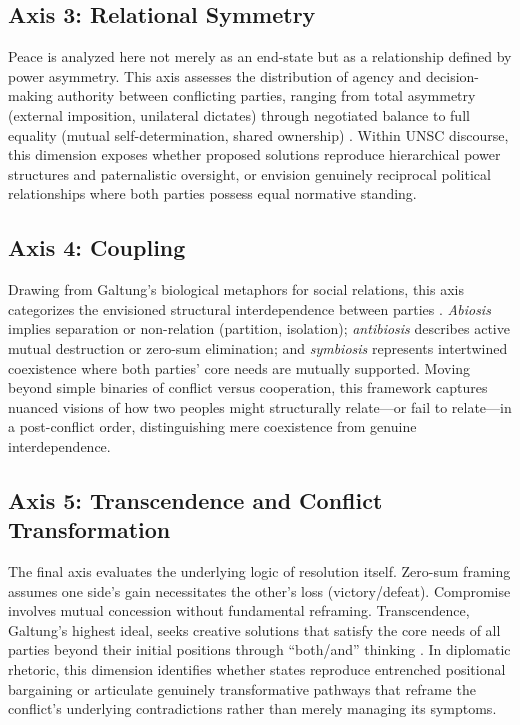 \documentclass[sigconf,review,anonymous,balance=false]{acmart}
\begin{document}
\subsection{Axis 3: Relational Symmetry}
Peace is analyzed here not merely as an end-state but as a relationship defined by power asymmetry. This axis assesses the distribution of agency and decision-making authority between conflicting parties, ranging from total asymmetry (external imposition, unilateral dictates) through negotiated balance to full equality (mutual self-determination, shared ownership) \cite{galtung2012peace}. Within UNSC discourse, this dimension exposes whether proposed solutions reproduce hierarchical power structures and paternalistic oversight, or envision genuinely reciprocal political relationships where both parties possess equal normative standing.
\subsection{Axis 4: Coupling}
Drawing from Galtung’s biological metaphors for social relations, this axis categorizes the envisioned structural interdependence between parties \cite{galtung2012peace}. \textit{Abiosis} implies separation or non-relation (partition, isolation); \textit{antibiosis} describes active mutual destruction or zero-sum elimination; and \textit{symbiosis} represents intertwined coexistence where both parties’ core needs are mutually supported. Moving beyond simple binaries of conflict versus cooperation, this framework captures nuanced visions of how two peoples might structurally relate—or fail to relate—in a post-conflict order, distinguishing mere coexistence from genuine interdependence.
\subsection{Axis 5: Transcendence and Conflict Transformation}
The final axis evaluates the underlying logic of resolution itself. Zero-sum framing assumes one side’s gain necessitates the other’s loss (victory/defeat). Compromise involves mutual concession without fundamental reframing. Transcendence, Galtung’s highest ideal, seeks creative solutions that satisfy the core needs of all parties beyond their initial positions through ``both/and'' thinking \cite{galtung2012peace}. In diplomatic rhetoric, this dimension identifies whether states reproduce entrenched positional bargaining or articulate genuinely transformative pathways that reframe the conflict’s underlying contradictions rather than merely managing its symptoms.
\end{document}
